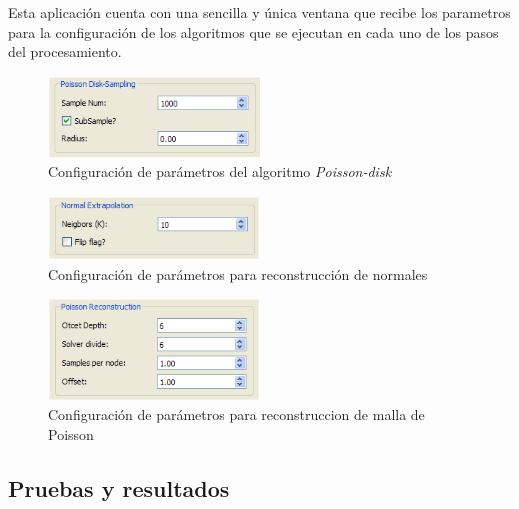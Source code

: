 Esta aplicación cuenta con una sencilla y única ventana que recibe los parametros para la configuración de los algoritmos que se ejecutan en cada uno de los pasos del procesamiento.

\begin{figure}[H]
  \centering
    \includegraphics[width=0.5\textwidth]{./Cap2_videomapping/malla-poissongui.png}
  \caption{Configuración de parámetros del algoritmo \emph{Poisson-disk}}
  \label{fig:Mesh-PoissonGui}
\end{figure}

\begin{figure}[H]
  \centering
    \includegraphics[width=0.5\textwidth]{./Cap2_videomapping/malla-normalextrapolation.png}
  \caption{Configuración de parámetros para reconstrucción de normales}
  \label{fig:Mesh-Extrapolation}
\end{figure}

\begin{figure}[H]
  \centering
    \includegraphics[width=0.5\textwidth]{./Cap2_videomapping/malla-poissonreconstruction.png}
  \caption{Configuración de parámetros para reconstruccion de malla de Poisson}
  \label{fig:Mesh-Normals}
\end{figure}


\subsection{Pruebas y resultados}


